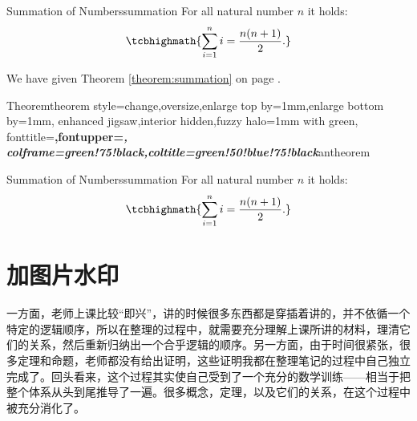 \documentclass{ctexart}
\begin{document}
\begin{theo}{Summation of Numbers}{summation}
  For all natural number $n$ it holds:
  \begin{equation}
  \tcbhighmath{\sum\limits_{i=1}^n i = \frac{n(n+1)}{2}.}
  \end{equation}
\end{theo}

We have given Theorem \ref{theorem:summation} on page \pageref{theorem:summation}.

%
  {Theorem}{theorem style=change,oversize,enlarge top by=1mm,enlarge bottom by=1mm,
    enhanced jigsaw,interior hidden,fuzzy halo=1mm with green,
     fonttitle=\bfseries\upshape,fontupper=\slshape,
     colframe=green!75!black,coltitle=green!50!blue!75!black}{antheorem}

\begin{antheo}{Summation of Numbers}{summation}
  For all natural number $n$ it holds:
  \begin{equation}
  \tcbhighmath{\sum\limits_{i=1}^n i = \frac{n(n+1)}{2}.}
  \end{equation}
\end{antheo}

\section{加图片水印}

\begin{tcolorbox}[enhanced,watermark graphics=graphicx.jpg,
  watermark opacity=0.3,watermark zoom=0.9,
  colback=green!5!white,colframe=green!75!black,
  fonttitle=\bfseries, title=Box with a watermark picture]
  一方面，老师上课比较“即兴”，讲的时候很多东西都是穿插着讲的，并不依循一个特定的逻辑顺序，所以在整理的过程中，就需要充分理解上课所讲的材料，理清它们的关系，然后重新归纳出一个合乎逻辑的顺序。另一方面，由于时间很紧张，很多定理和命题，老师都没有给出证明，这些证明我都在整理笔记的过程中自己独立完成了。回头看来，这个过程其实使自己受到了一个充分的数学训练——相当于把整个体系从头到尾推导了一遍。很多概念，定理，以及它们的关系，在这个过程中被充分消化了。
\end{tcolorbox}

\end{document}
